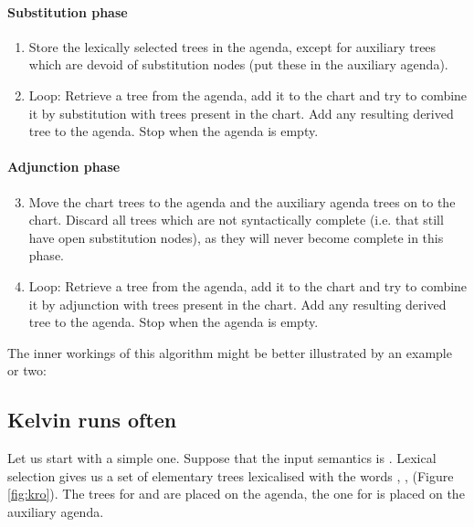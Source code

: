 \paragraph{Substitution phase}
\begin{enumerate}
\item Store the lexically selected trees in
  the agenda, except for auxiliary trees which are devoid of
  substitution nodes (put these in the auxiliary agenda).\\
\item Loop: Retrieve a tree from the agenda, add it to the chart and try
  to combine it by substitution with trees present in the chart. Add any
  resulting derived tree to the agenda. Stop when the agenda is empty.
\end{enumerate}

\paragraph{Adjunction phase}
\begin{enumerate}
\setcounter{enumi}{2}
\item Move the chart trees to the agenda and the auxiliary agenda trees
      on to the chart.  Discard all trees which are not syntactically
      complete (i.e. that still have open substitution nodes), as they
      will never become complete in this phase.
\item Loop: Retrieve a tree from the agenda, add it to the chart and try to
  combine it by adjunction with trees present in the chart. Add any
  resulting derived tree to the agenda. Stop when the agenda is empty.
\end{enumerate}

\noindent
The inner workings of this algorithm might be better illustrated by an
example or two:

\subsection{Kelvin runs often}


Let us start with a simple one. Suppose that the input semantics is
.
Lexical selection gives us a set of elementary
trees lexicalised with the words ,
,  (Figure \ref{fig:kro}).  The
trees for  and  are placed on
the agenda, the one for  is placed on the auxiliary
agenda.

